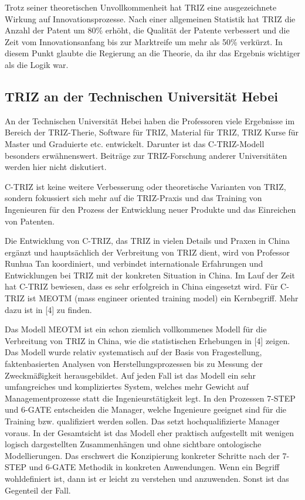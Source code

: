 \documentclass[11pt,a4paper]{article}
\begin{document}
Trotz seiner theoretischen Unvollkommenheit hat TRIZ eine ausgezeichnete
Wirkung auf Innovationsprozesse. Nach einer allgemeinen Statistik hat TRIZ die
Anzahl der Patent um 80\% erhöht, die Qualität der Patente verbessert und die
Zeit vom Innovationsanfang bis zur Marktreife um mehr als 50\% verkürzt. In
diesem Punkt glaubte die Regierung an die Theorie, da ihr das Ergebnis
wichtiger als die Logik war.

\subsection{TRIZ an der Technischen Universität Hebei}

An der Technischen Universität Hebei haben die Professoren viele Ergebnisse im
Bereich der TRIZ-Therie, Software für TRIZ, Material für TRIZ, TRIZ Kurse für
Master und Graduierte etc. entwickelt. Darunter ist das C-TRIZ-Modell
besonders erwähnenswert. Beiträge zur TRIZ-Forschung anderer Universitäten
werden hier nicht diskutiert.

C-TRIZ ist keine weitere Verbesserung oder theoretische Varianten von TRIZ,
sondern fokussiert sich mehr auf die TRIZ-Praxis und das Training von
Ingenieuren für den Prozess der Entwicklung neuer Produkte und das Einreichen
von Patenten.

Die Entwicklung von C-TRIZ, das TRIZ in vielen Details und Praxen in China
ergänzt und hauptsächlich der Verbreitung von TRIZ dient, wird von Professor
Runhua Tan koordiniert, und verbindet internationale Erfahrungen und
Entwicklungen bei TRIZ mit der konkreten Situation in China. Im Lauf der Zeit
hat C-TRIZ bewiesen, dass es sehr erfolgreich in China eingesetzt wird. Für
C-TRIZ ist MEOTM (mass engineer oriented training model) ein Kernbegriff.
Mehr dazu ist in [4] zu finden.

Das Modell MEOTM ist ein schon ziemlich vollkommenes Modell für die
Verbreitung von TRIZ in China, wie die statistischen Erhebungen in [4]
zeigen. Das Modell wurde relativ systematisch auf der Basis von Fragestellung,
faktenbasierten Analysen von Herstellungsprozessen bis zu Messung der
Zweckmäßigkeit herausgebildet. Auf jeden Fall ist das Modell ein sehr
umfangreiches und kompliziertes System, welches mehr Gewicht auf
Managementprozesse statt die Ingenieurstätigkeit legt. In den Prozessen 7-STEP
und 6-GATE entscheiden die Manager, welche Ingenieure geeignet sind für die
Training bzw. qualifiziert werden sollen. Das setzt hochqualifizierte Manager
voraus.  In der Gesamtsicht ist das Modell eher praktisch aufgestellt mit
wenigen logisch dargestellten Zusammenhängen und ohne sichtbare ontologische
Modellierungen.  Das erschwert die Konzipierung konkreter Schritte nach der
7-STEP und 6-GATE Methodik in konkreten Anwendungen. Wenn ein Begriff
wohldefiniert ist, dann ist er leicht zu verstehen und anzuwenden. Sonst ist
das Gegenteil der Fall.
\end{document}
